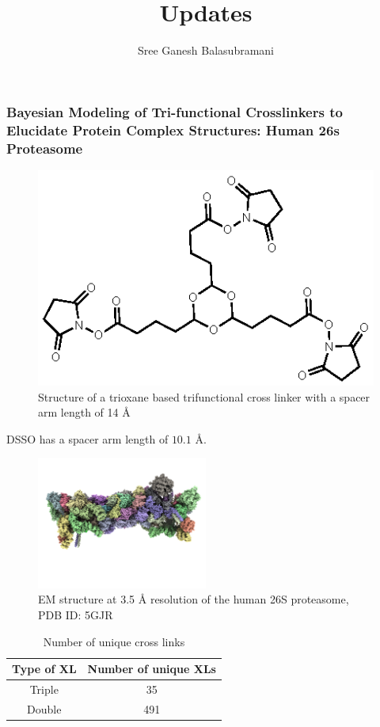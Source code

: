 \documentclass[a4paper,8pt]{beamer}
\title{Updates}
\author[]{Sree Ganesh Balasubramani}
\institute[UCSF]{Echeverria Group, UC San Francisco}
\date{}
\begin{document}
\maketitle
%
\begin{frame}
  \frametitle{Bayesian Modeling of Tri-functional Crosslinkers to Elucidate Protein 
Complex Structures: Human 26s Proteasome}
  \begin{figure}
    \centering
    \includegraphics[scale=1.0]{figures/tri-linker.eps}
    \caption{Structure of a trioxane based trifunctional cross linker with a 
    spacer arm length of 14 {\AA}}
  \end{figure}
  DSSO has a spacer arm length of $10.1$ {\AA}.
\end{frame}
%
\begin{frame}
    \begin{figure}
    \centering
    \includegraphics[width=0.5\textwidth]{figures/5gjr_structure.png}
    \caption{EM structure at 3.5 {\AA} resolution of the human 26S proteasome, PDB ID: 5GJR}
    \end{figure}
\begin{table}
    \centering
    \caption{Number of unique cross links}
    \begin{tabular}{|c|c|}
        \hline
        Type of XL & Number of unique XLs \\ \hline
        Triple & 35 \\ \hline
        Double & 491 \\ \hline
    \end{tabular}
\end{table}
\end{frame}
\end{document}
